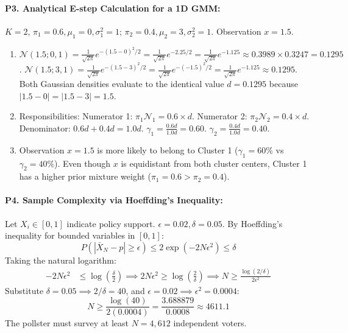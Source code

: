 \paragraph{P3. Analytical E-step Calculation for a 1D GMM:}
$K = 2$, $\pi_1 = 0.6, \mu_1 = 0, \sigma_1^2 = 1$; $\pi_2 = 0.4, \mu_2 = 3, \sigma_2^2 = 1$.
Observation $x = 1.5$.
\begin{enumerate}[label=(\alph*)]
    \item $\mathcal{N}(1.5; 0, 1) = \frac{1}{\sqrt{2\pi}}e^{-(1.5-0)^2/2} = \frac{1}{\sqrt{2\pi}}e^{-2.25/2} = \frac{1}{\sqrt{2\pi}}e^{-1.125} \approx 0.3989 \times 0.3247 = 0.1295$.
    $\mathcal{N}(1.5; 3, 1) = \frac{1}{\sqrt{2\pi}}e^{-(1.5-3)^2/2} = \frac{1}{\sqrt{2\pi}}e^{-(-1.5)^2/2} = \frac{1}{\sqrt{2\pi}}e^{-1.125} \approx 0.1295$.
    Both Gaussian densities evaluate to the identical value $d = 0.1295$ because $|1.5 - 0| = |1.5 - 3| = 1.5$.
    \item Responsibilities:
    Numerator 1: $\pi_1 \mathcal{N}_1 = 0.6 \times d$.
    Numerator 2: $\pi_2 \mathcal{N}_2 = 0.4 \times d$.
    Denominator: $0.6d + 0.4d = 1.0d$.
    $\gamma_1 = \frac{0.6d}{1.0d} = 0.60$.
    $\gamma_2 = \frac{0.4d}{1.0d} = 0.40$.
    \item Observation $x = 1.5$ is more likely to belong to Cluster 1 ($\gamma_1 = 60\%$ vs $\gamma_2 = 40\%$). Even though $x$ is equidistant from both cluster centers, Cluster 1 has a higher prior mixture weight ($\pi_1 = 0.6 > \pi_2 = 0.4$).
\end{enumerate}

\paragraph{P4. Sample Complexity via Hoeffding's Inequality:}
Let $X_i \in [0, 1]$ indicate policy support. $\epsilon = 0.02, \delta = 0.05$.
By Hoeffding's inequality for bounded variables in $[0, 1]$:
\begin{equation*}
P(|\bar{X}_N - p| \ge \epsilon) \le 2\exp(-2N\epsilon^2) \le \delta
\end{equation*}
Taking the natural logarithm:
\begin{align*}
-2N\epsilon^2 &\le \log\left(\frac{\delta}{2}\right) \implies 2N\epsilon^2 \ge \log\left(\frac{2}{\delta}\right) \implies N \ge \frac{\log(2/\delta)}{2\epsilon^2}
\end{align*}
Substitute $\delta = 0.05 \implies 2/\delta = 40$, and $\epsilon = 0.02 \implies \epsilon^2 = 0.0004$:
\begin{equation*}
N \ge \frac{\log(40)}{2(0.0004)} = \frac{3.688879}{0.0008} \approx 4611.1
\end{equation*}
The pollster must survey at least $N = 4{,}612$ independent voters.

